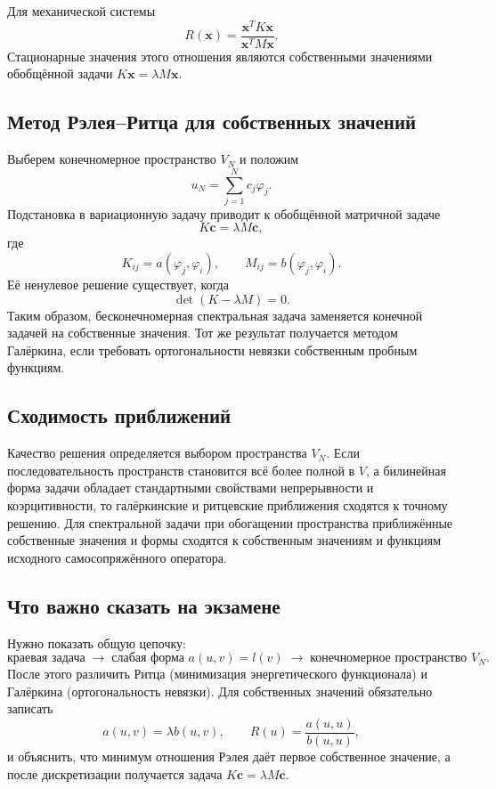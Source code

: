 Для механической системы
\[
    R(\mathbf x)=\frac{\mathbf x^T K\mathbf x}
                       {\mathbf x^T M\mathbf x}.
\]
Стационарные значения этого отношения являются собственными значениями
обобщённой задачи $K\mathbf x=\lambda M\mathbf x$.

\subsection{Метод Рэлея--Ритца для собственных значений}

Выберем конечномерное пространство $V_N$ и положим
\[
    u_N=\sum_{j=1}^{N}c_j\varphi_j.
\]
Подстановка в вариационную задачу приводит к обобщённой матричной задаче
\[
    K\mathbf c=\lambda M\mathbf c,
\]
где
\[
    K_{ij}=a(\varphi_j,\varphi_i),
    \qquad
    M_{ij}=b(\varphi_j,\varphi_i).
\]
Её ненулевое решение существует, когда
\[
    \det(K-\lambda M)=0.
\]
Таким образом, бесконечномерная спектральная задача заменяется конечной
задачей на собственные значения. Тот же результат получается методом
Галёркина, если требовать ортогональности невязки собственным пробным функциям.

\subsection{Сходимость приближений}

Качество решения определяется выбором пространства $V_N$. Если
последовательность пространств становится всё более полной в $V$, а билинейная
форма задачи обладает стандартными свойствами непрерывности и коэрцитивности,
то галёркинские и ритцевские приближения сходятся к точному решению. Для
спектральной задачи при обогащении пространства приближённые собственные
значения и формы сходятся к собственным значениям и функциям исходного
самосопряжённого оператора.

\subsection{Что важно сказать на экзамене}

Нужно показать общую цепочку:
\[
    \text{краевая задача}
    \;\longrightarrow\;
    \text{слабая форма }a(u,v)=l(v)
    \;\longrightarrow\;
    \text{конечномерное пространство }V_N.
\]
После этого различить Ритца (минимизация энергетического функционала) и
Галёркина (ортогональность невязки). Для собственных значений обязательно
записать
\[
    a(u,v)=\lambda b(u,v),
    \qquad
    R(u)=\frac{a(u,u)}{b(u,u)},
\]
и объяснить, что минимум отношения Рэлея даёт первое собственное значение, а
после дискретизации получается задача $K\mathbf c=\lambda M\mathbf c$.

\newpage
